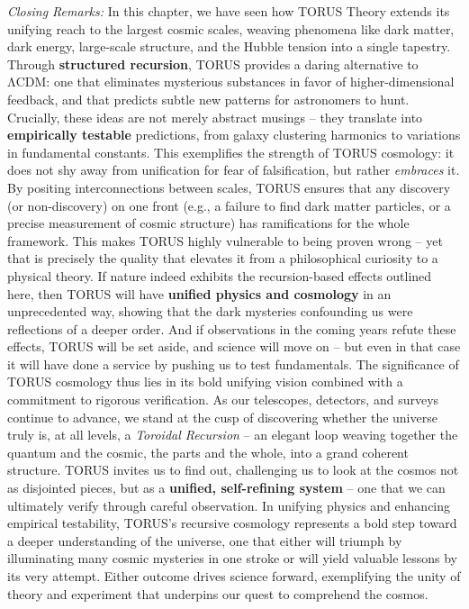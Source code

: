 \emph{Closing Remarks:} In this chapter, we have seen how TORUS Theory
extends its unifying reach to the largest cosmic scales, weaving
phenomena like dark matter, dark energy, large-scale structure, and the
Hubble tension into a single tapestry. Through \textbf{structured
recursion}, TORUS provides a daring alternative to ΛCDM: one that
eliminates mysterious substances in favor of higher-dimensional
feedback, and that predicts subtle new patterns for astronomers to hunt.
Crucially, these ideas are not merely abstract musings -- they translate
into \textbf{empirically testable} predictions, from galaxy clustering
harmonics to variations in fundamental constants​. This exemplifies the
strength of TORUS cosmology: it does not shy away from unification for
fear of falsification, but rather \emph{embraces} it. By positing
interconnections between scales, TORUS ensures that any discovery (or
non-discovery) on one front (e.g., a failure to find dark matter
particles, or a precise measurement of cosmic structure) has
ramifications for the whole framework. This makes TORUS highly
vulnerable to being proven wrong -- yet that is precisely the quality
that elevates it from a philosophical curiosity to a physical theory. If
nature indeed exhibits the recursion-based effects outlined here, then
TORUS will have \textbf{unified physics and cosmology} in an
unprecedented way, showing that the dark mysteries confounding us were
reflections of a deeper order. And if observations in the coming years
refute these effects, TORUS will be set aside, and science will move on
-- but even in that case it will have done a service by pushing us to
test fundamentals. The significance of TORUS cosmology thus lies in its
bold unifying vision combined with a commitment to rigorous
verification. As our telescopes, detectors, and surveys continue to
advance, we stand at the cusp of discovering whether the universe truly
is, at all levels, a \emph{Toroidal Recursion} -- an elegant loop
weaving together the quantum and the cosmic, the parts and the whole,
into a grand coherent structure. TORUS invites us to find out,
challenging us to look at the cosmos not as disjointed pieces, but as a
\textbf{unified, self-refining system} -- one that we can ultimately
verify through careful observation​. In unifying physics and enhancing
empirical testability, TORUS's recursive cosmology represents a bold
step toward a deeper understanding of the universe, one that either will
triumph by illuminating many cosmic mysteries in one stroke or will
yield valuable lessons by its very attempt​. Either outcome drives
science forward, exemplifying the unity of theory and experiment that
underpins our quest to comprehend the cosmos.

